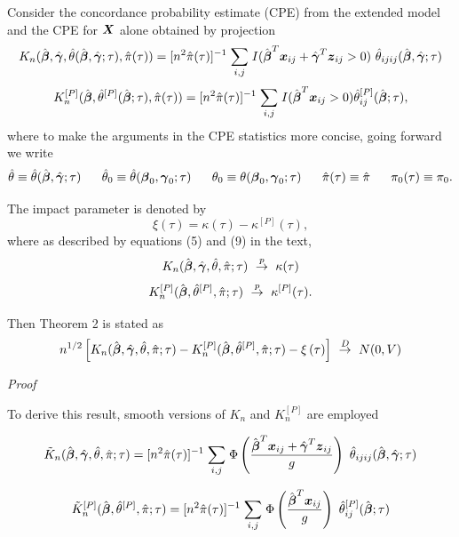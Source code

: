 \documentclass[12pt]{article}
\newcommand{\bmx}{\mbox{\boldmath $x$}}
\newcommand{\bmX}{\mbox{\boldmath $X$}}
\newcommand{\bg}{\mbox{\boldmath $\gamma$}}
\newcommand{\bb}{\mbox{\boldmath $\beta$}}
\newcommand{\bmz}{\mbox{\boldmath $z$}}
\def\stackunder#1#2{\mathrel{\mathop{#2}\limits_{#1}}}
\begin{document}
\noindent Consider the concordance probability estimate (CPE) from the extended model and the CPE for $\bmX$ alone obtained by projection  
\[ K_n (\hat{\bb},\hat{\bg}, \hat{\theta}(\hat{\bb},\hat{\bg};\tau),\hat{\pi}(\tau)) = 
[n^{2}\hat{\pi}(\tau)]^{-1} \stackunder{i, j}{\sum} I(\hat{\bb}^T\bmx_{ij} + \hat{\bg}^T\bmz_{ij} > 0)  \ \hat{\theta}_{ijij}(\hat{\bb},\hat{\bg};\tau)  \]
\[ K_n^{[P]}(\hat{\bb}, \hat{\theta}^{[P]}(\hat{\bb};\tau),\hat{\pi}(\tau)) =  
[n^{2}\hat{\pi}(\tau)]^{-1} \stackunder{i, j}{\sum}  I(\hat{\bb}^T\bmx_{ij}>0) \hat{\theta}_{ij}^{[P]}(\hat{\bb};\tau) ,\]
where to make the arguments in the CPE statistics more concise, going forward we write
\[ \hat{\theta} \equiv \hat{\theta}(\hat{\bb},\hat{\bg};\tau) \ \ \ \ \ \hat{\theta}_0 \equiv \hat{\theta}(\bb_0, \bg_0;\tau)  \ \ \ \ \  \theta_0 \equiv \theta(\bb_0, \bg_0;\tau) \ \ \ \ \ \hat{\pi}(\tau) \equiv \hat{\pi} \ \ \ \ \ \pi_0(\tau) \equiv \pi_0  . \]

\noindent The impact parameter is denoted by 
\[ \xi(\tau) = \kappa(\tau) - \kappa^{[P]}(\tau) ,\]
where as described by equations (5) and (9) in the text, 
\[ K_n (\hat{\bb},\hat{\bg}, \hat{\theta},\hat{\pi};\tau) \ \stackrel{p}{\rightarrow} \ \kappa(\tau)  \] 
\[  K_n^{[P]} (\hat{\bb}, \hat{\theta}^{[P]},\hat{\pi};\tau) \ \stackrel{p}{\rightarrow} \ \kappa^{[P]}(\tau) . \]

\noindent Then Theorem 2 is stated as  
\begin{equation} n^{1/2} \left[K_n (\hat{\bb},\hat{\bg}, \hat{\theta},\hat{\pi};\tau) - K_n^{[P]}(\hat{\bb}, \hat{\theta}^{[P]},\hat{\pi};\tau) - \xi \left(\tau \right) \right]  \ \stackrel{D}{\rightarrow} \ N(0, V)  \end{equation}


\newpage

{\it Proof}

\noindent To derive this result, smooth versions of $K_n$ and $K_n^{[P]}$ are employed

\[ \tilde{K}_n(\hat{\bb},\hat{\bg}, \hat{\theta},\hat{\pi};\tau) = 
[n^2 \hat{\pi}(\tau)]^{-1} \stackunder{i, j }{\sum }\Phi \left(\frac{\hat{\bb}^T\bmx_{ij} + \hat{\bg}^T\bmz_{ij}}{g} \right)  \ \hat{\theta}_{ijij}(\hat{\bb},\hat{\bg};\tau)   \]
 
\[\tilde{K}_n^{[P]}(\hat{\bb},\hat{\theta}^{[P]},\hat{\pi};\tau) = [n^2 \hat{\pi}(\tau)]^{-1} \stackunder{i, j}{\sum}  \Phi \left(\frac{\hat{\bb}^T\bmx_{ij}}{g} \right) \ \hat{\theta}_{ij}^{[P]}(\hat{\bb};\tau)  \]


\vskip 0.25in
\end{document}

